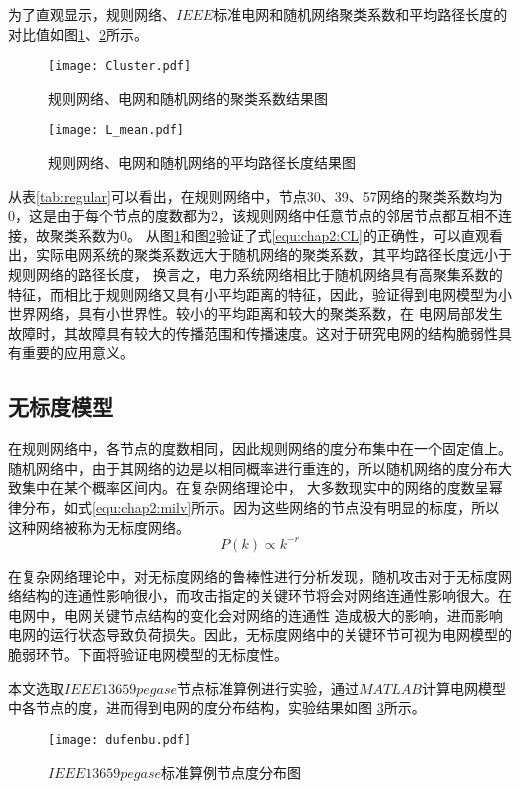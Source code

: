 为了直观显示，规则网络、$IEEE$标准电网和随机网络聚类系数和平均路径长度的对比值如图\ref{fig:Cluster}、\ref{fig:L_mean}所示。
\begin{figure}[H] %
    \centering
    \texttt{[image: Cluster.pdf]}
    \caption{规则网络、电网和随机网络的聚类系数结果图}
    \label{fig:Cluster}
\end{figure}

\begin{figure}[H] %
    \centering
    \texttt{[image: L\_mean.pdf]}
    \caption{规则网络、电网和随机网络的平均路径长度结果图}
    \label{fig:L_mean}
\end{figure}

从表\ref{tab:regular}可以看出，在规则网络中，节点30、39、57网络的聚类系数均为0，这是由于每个节点的度数都为2，该规则网络中任意节点的邻居节点都互相不连接，故聚类系数为0。
从图\ref{fig:Cluster}和图\ref{fig:L_mean}验证了式\ref{equ:chap2:CL}的正确性，可以直观看出，实际电网系统的聚类系数远大于随机网络的聚类系数，其平均路径长度远小于规则网络的路径长度，
换言之，电力系统网络相比于随机网络具有高聚集系数的特征，而相比于规则网络又具有小平均距离的特征，因此，验证得到电网模型为小世界网络，具有小世界性。较小的平均距离和较大的聚类系数，在
电网局部发生故障时，其故障具有较大的传播范围和传播速度。这对于研究电网的结构脆弱性具有重要的应用意义。

\subsection{无标度模型}
\label{sec:windModel}
在规则网络中，各节点的度数相同，因此规则网络的度分布集中在一个固定值上。随机网络中，由于其网络的边是以相同概率进行重连的，所以随机网络的度分布大致集中在某个概率区间内。在复杂网络理论中，
大多数现实中的网络的度数呈幂律分布，如式\ref{equ:chap2:milv}所示。因为这些网络的节点没有明显的标度，所以这种网络被称为无标度网络。
\begin{equation}
\label{equ:chap2:milv}
P(k) \propto k^{-r}
\end{equation}

在复杂网络理论中，对无标度网络的鲁棒性进行分析发现，随机攻击对于无标度网络结构的连通性影响很小，而攻击指定的关键环节将会对网络连通性影响很大。在电网中，电网关键节点结构的变化会对网络的连通性
造成极大的影响，进而影响电网的运行状态导致负荷损失\cite{refsBA}。因此，无标度网络中的关键环节可视为电网模型的脆弱环节。下面将验证电网模型的无标度性。

本文选取$IEEE13659pegase$节点标准算例进行实验，通过$MATLAB$计算电网模型中各节点的度，进而得到电网的度分布结构，实验结果如图
\ref{fig:dufenbu}所示。
\begin{figure}[H] %
  \centering
  \texttt{[image: dufenbu.pdf]}
  \caption{$IEEE13659pegase$标准算例节点度分布图}
  \label{fig:dufenbu}
\end{figure}


